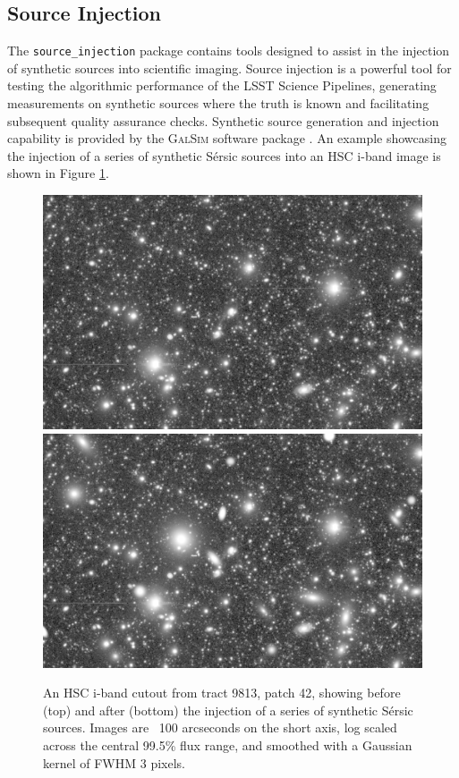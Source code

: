 \subsection{Source Injection}
\label{sec:source_injection}

The \texttt{source\_injection} package contains tools designed to assist in the injection of synthetic sources into scientific imaging.
Source injection is a powerful tool for testing the algorithmic performance of the LSST Science Pipelines, generating measurements on synthetic sources where the truth is known and facilitating subsequent quality assurance checks.
Synthetic source generation and injection capability is provided by the \textsc{GalSim} software package \citep{2015A&C....10..121R}.
An example showcasing the injection of a series of synthetic Sérsic sources into an HSC i-band image is shown in Figure \ref{fig:source_injection_example}.

\begin{figure}
    \centering
    \includegraphics[width=\linewidth]{figures/analysis/source_injection/t9813p42i_zoom_sersic_pre_injection}
    \includegraphics[width=\linewidth]{figures/analysis/source_injection/t9813p42i_zoom_sersic_post_injection}
    \caption{
        An HSC i-band cutout from tract 9813, patch 42, showing before (top) and after (bottom) the injection of a series of synthetic Sérsic sources.
        Images are ~100 arcseconds on the short axis, log scaled across the central 99.5\% flux range, and smoothed with a Gaussian kernel of FWHM 3 pixels.
    }
    \label{fig:source_injection_example}
\end{figure}

